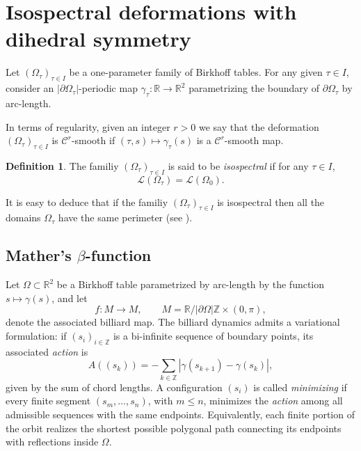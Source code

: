 \documentclass[12pt, openany]{amsart}
\theoremstyle{definition}
\newtheorem{definition}[theorem]{Definition}
\theoremstyle{remark}
\theoremstyle{remark}
\theoremstyle{theorem}
\theoremstyle{theorem}
\theoremstyle{theorem}
\theoremstyle{theorem}
\newcommand{\ZZ}{\mathbb{Z}}
\newcommand{\RR}{\mathbb{R}}
\begin{document}
\section{Isospectral deformations with dihedral symmetry}
\label{section:tools_isospectral}

Let $(\Omega_{\tau})_{\tau\in I}$ be a one-parameter family of Birkhoff tables. For any given $\tau\in I$, consider an $|\partial\Omega_{\tau}|$-periodic map $\gamma_{\tau}:\RR\to\RR^2$ parametrizing the boundary of $\partial\Omega_{\tau}$ by arc-length.

In terms of regularity, given an integer $r>0$ we say that the deformation $(\Omega_{\tau})_{\tau\in I}$ is $\mathscr C^r$-smooth if $(\tau,s)\mapsto\gamma_{\tau}(s)$ is a $\mathscr C^r$-smooth map.

\begin{definition}
The familiy $(\Omega_{\tau})_{\tau\in I}$  is said to be \textit{isospectral} if for any $\tau\in I$,
\[
\mathscr L(\Omega_{\tau}) = \mathscr L(\Omega_{0}).
\]
\end{definition}

It is easy to deduce that if the familiy $(\Omega_{\tau})_{\tau\in I}$  is isospectral then all the domains $\Omega_{\tau}$ 
have the same perimeter (see \cite[Proposition 3.2.8]{Siburg}). 



\subsection{Mather's $\beta$-function}\label{secbetafunction}
 
Let $\Omega \subset \mathbb{R}^2$ be a Birkhoff table parametrized by arc-length by the function $s\mapsto\gamma(s)$, and let 
\[
f : M \to M, \qquad M = \RR/|\partial\Omega|\ZZ\times (0,\pi),
\]
denote the associated billiard map. 
The billiard dynamics admits a variational formulation: if $(s_i)_{i \in \mathbb{Z}}$ is a bi-infinite sequence 
of boundary points, its associated \textit{action} is 
\[
A((s_k)) =- \sum_{k \in \mathbb{Z}} |\gamma(s_{k+1}) - \gamma(s_k)|,
\]
given by the sum of chord lengths. A configuration $(s_i)$ is called \emph{minimizing} if every finite segment 
$(s_m, \dots, s_n)$, with $m\leq n$, minimizes the \textit{action} among all admissible sequences with the same endpoints. 
Equivalently, each finite portion of the orbit realizes the shortest possible polygonal path connecting its 
endpoints with reflections inside $\Omega$. 
\end{document}
